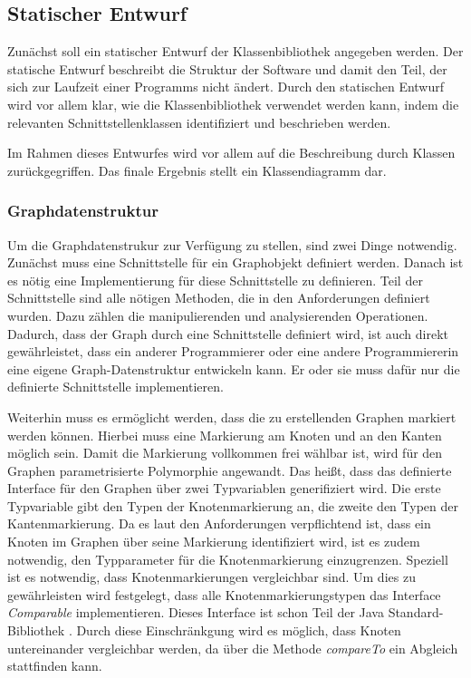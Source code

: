\documentclass[a4paper,12pt,ngerman,chapterprefix=false,listof=totoc,bibliography=totoc]{scrreprt}
\begin{document}
{{\subsection{Statischer Entwurf}
{
Zunächst soll ein statischer Entwurf der Klassenbibliothek angegeben werden. Der statische Entwurf beschreibt die Struktur der Software und damit den Teil, der sich zur Laufzeit einer Programms nicht ändert. Durch den statischen Entwurf wird vor allem klar, wie die Klassenbibliothek verwendet werden kann, indem die relevanten Schnittstellenklassen identifiziert und beschrieben werden.

Im Rahmen dieses Entwurfes wird vor allem auf die Beschreibung durch Klassen zurückgegriffen. Das finale Ergebnis stellt ein Klassendiagramm dar.
}
\subsubsection*{Graphdatenstruktur}
{
Um die Graphdatenstrukur zur Verfügung zu stellen, sind zwei Dinge notwendig. Zunächst muss eine Schnittstelle für ein Graphobjekt definiert werden. Danach ist es nötig eine Implementierung für diese Schnittstelle zu definieren. Teil der Schnittstelle sind alle nötigen Methoden, die in den Anforderungen definiert wurden. Dazu zählen die manipulierenden und analysierenden Operationen. Dadurch, dass der Graph durch eine Schnittstelle definiert wird, ist auch direkt gewährleistet, dass ein anderer Programmierer oder eine andere Programmiererin eine eigene Graph-Datenstruktur entwickeln kann. Er oder sie muss dafür nur die definierte Schnittstelle implementieren.

Weiterhin muss es ermöglicht werden, dass die zu erstellenden Graphen markiert werden können. Hierbei muss eine Markierung am Knoten und an den Kanten möglich sein. Damit die Markierung vollkommen frei wählbar ist, wird für den Graphen parametrisierte Polymorphie angewandt. Das heißt, dass das definierte Interface für den Graphen über zwei Typvariablen generifiziert wird. Die erste Typvariable gibt den Typen der Knotenmarkierung an, die zweite den Typen der Kantenmarkierung. Da es laut den Anforderungen verpflichtend ist, dass ein Knoten im Graphen über seine Markierung identifiziert wird, ist es zudem notwendig, den Typparameter für die Knotenmarkierung einzugrenzen. Speziell ist es notwendig, dass Knotenmarkierungen vergleichbar sind. Um dies zu gewährleisten wird festgelegt, dass alle Knotenmarkierungstypen das Interface \textit{Comparable} implementieren. Dieses Interface ist schon Teil der Java Standard-Bibliothek \cite{oracle_java_2021}. Durch diese Einschränkgung wird es möglich, dass Knoten untereinander vergleichbar werden, da über die Methode \textit{compareTo} ein Abgleich stattfinden kann.

}}}
\end{document}
